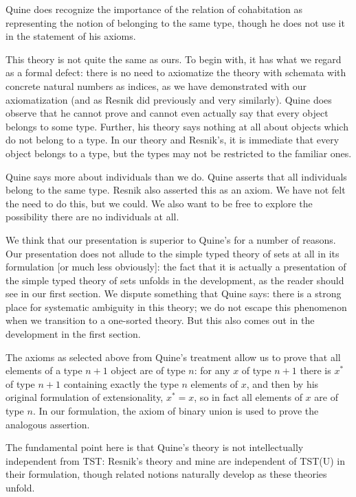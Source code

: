\documentclass[12pt]{article}
\begin{document}
Quine does recognize the importance of the relation of cohabitation as representing the notion of belonging to the same type, though he does not use it in the statement of his axioms.

This theory is not quite the same as ours.  To begin with, it has what we regard as a formal defect:  there is no need to axiomatize the theory with schemata with concrete natural numbers as indices, as we have demonstrated with our axiomatization (and as Resnik did previously and very similarly).  Quine does observe that he cannot prove and cannot even actually say that every object belongs to some type.  Further, his theory says nothing at all about objects which do not belong to a type. In our theory and Resnik's, it is immediate that every object belongs to a type, but the types may not be restricted to the familiar ones.

Quine says more about individuals than we do.  Quine asserts that all individuals belong to the same type.  Resnik also asserted this as an axiom.  We have not felt the need to do this, but we could.  We also want to be free to explore the possibility there are no individuals at all.

We think that our presentation is superior to Quine's for a number of reasons.  Our presentation does not allude to the simple typed theory of sets at all in its formulation [or much less obviously]:  the fact that it is actually a presentation of the simple typed theory of sets unfolds in the development, as the reader should see in our first section.  We dispute something that Quine says:  there is a strong place for systematic ambiguity in this theory; we do not escape this phenomenon when we transition to a one-sorted theory.  But this also comes out in the development in the first section.

The axioms as selected above from Quine's treatment allow us to prove that
all elements of a type $n+1$ object are of type $n$:  for any $x$ of type $n+1$ there
is $x^*$ of type $n+1$ containing exactly the type $n$ elements of $x$, and then by his original formulation of extensionality, $x^*=x$, so in fact all elements of $x$ are of type $n$.  In our formulation, the axiom of binary union is used to prove the analogous assertion.

The fundamental point here is that Quine's theory is not intellectually independent from TST:  Resnik's theory and mine are independent of TST(U) in their formulation, though related notions naturally develop as these theories unfold.
\end{document}
